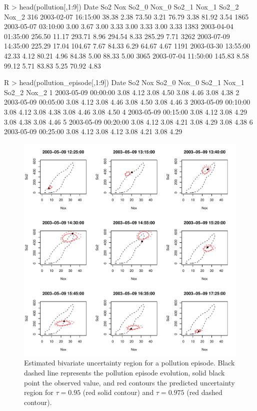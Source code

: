 \begin{example}
R > head(pollution[,1:9])
                Date      So2   Nox   So2_0  Nox_0 So2_1  Nox_1 So2_2  Nox_2
316  2003-02-07 16:15:00  38.38  2.38  73.50  3.21  76.79  3.38  81.92  3.54
1865 2003-05-07 03:10:00   3.00  3.67   3.00  3.33   3.00  3.33   3.00  3.33
1383 2003-04-04 01:35:00 256.50 11.17 293.71  8.96 294.54  8.33 285.29  7.71
3262 2003-07-09 14:35:00 225.29 17.04 104.67  7.67  84.33  6.29  64.67  4.67
1191 2003-03-30 13:55:00  42.33  4.12  80.21  4.96  84.38  5.00  88.33  5.00
3065 2003-07-04 11:50:00 145.83  8.58  99.12  5.71  83.83  5.25  70.92  4.83
	
R > head(pollution_episode[,1:9])
                Date  So2  Nox So2_0 Nox_0 So2_1 Nox_1 So2_2 Nox_2
1 2003-05-09 00:00:00 3.08 4.12  3.08  4.50  3.08  4.46  3.08  4.38
2 2003-05-09 00:05:00 3.08 4.12  3.08  4.46  3.08  4.50  3.08  4.46
3 2003-05-09 00:10:00 3.08 4.12  3.08  4.38  3.08  4.46  3.08  4.50
4 2003-05-09 00:15:00 3.08 4.12  3.08  4.29  3.08  4.38  3.08  4.46
5 2003-05-09 00:20:00 3.08 4.12  3.08  4.21  3.08  4.29  3.08  4.38
6 2003-05-09 00:25:00 3.08 4.12  3.08  4.12  3.08  4.21  3.08  4.29
\end{example}


\begin{figure}[!htb]
	\centering
	\includegraphics[width = \textwidth]{Fig8.pdf}
	\caption{Estimated bivariate uncertainty region for a pollution episode. Black dashed line represents the pollution episode evolution, solid black point the observed value, and red contours the predicted uncertainty region for $\tau = 0.95$ (red solid contour) and $\tau = 0.975$ (red dashed contour).}
	\label{pred_pol}
\end{figure}

